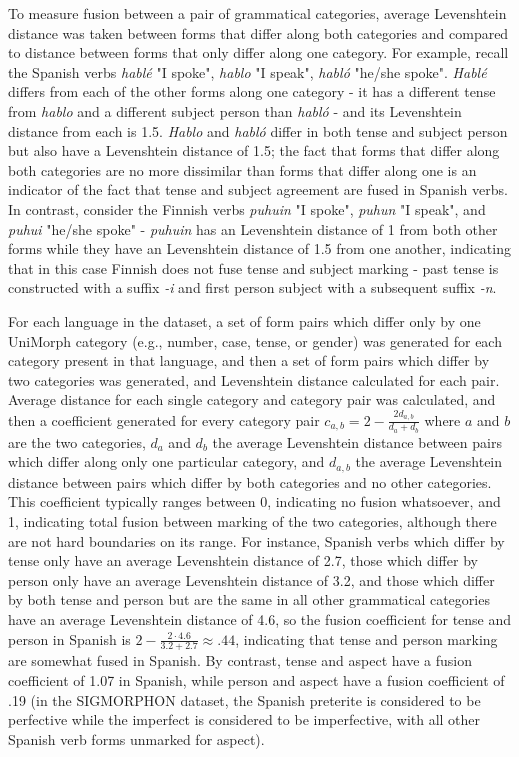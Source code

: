 To measure fusion between a pair of grammatical categories, average Levenshtein distance was taken between forms that differ along both categories and compared to distance between forms that only differ along one category. For example, recall the Spanish verbs \textit{hablé} "I spoke", \textit{hablo} "I speak", \textit{habló} "he/she spoke". \textit{Hablé} differs from each of the other forms along one category - it has a different tense from \textit{hablo} and a different subject person than \textit{habló} - and its Levenshtein distance from each is 1.5. \textit{Hablo} and \textit{habló} differ in both tense and subject person but also have a Levenshtein distance of 1.5; the fact that forms that differ along both categories are no more dissimilar than forms that differ along one is an indicator of the fact that tense and subject agreement are fused in Spanish verbs. In contrast, consider the Finnish verbs \textit{puhuin} "I spoke", \textit{puhun} "I speak", and \textit{puhui} "he/she spoke" - \textit{puhuin} has an Levenshtein distance of 1 from both other forms while they have an Levenshtein distance of 1.5 from one another, indicating that in this case Finnish does not fuse tense and subject marking - past tense is constructed with a suffix \textit{-i} and first person subject with a subsequent suffix \textit{-n}. 

For each language in the dataset, a set of form pairs which differ only by one UniMorph category (e.g., number, case, tense, or gender) was generated for each category present in that language, and then a set of form pairs which differ by two categories was generated, and Levenshtein distance calculated for each pair. Average distance for each single category and category pair was calculated, and then a coefficient generated for every category pair $c_{a,b} = 2 - \frac{2d_{a,b}}{d_a + d_b}$ where $a$ and $b$ are the two categories, $d_a$ and $d_b$ the average Levenshtein distance between pairs which differ along only one particular category, and $d_{a,b}$ the average Levenshtein distance between pairs which differ by both categories and no other categories. This coefficient typically ranges between 0, indicating no fusion whatsoever, and 1, indicating total fusion between marking of the two categories, although there are not hard boundaries on its range. For instance, Spanish verbs which differ by tense only have an average Levenshtein distance of 2.7, those which differ by person only have an average Levenshtein distance of 3.2, and those which differ by both tense and person but are the same in all other grammatical categories have an average Levenshtein distance of 4.6, so the fusion coefficient for tense and person in Spanish is $2 - \frac{2\cdot4.6}{3.2+2.7} \approx .44$, indicating that tense and person marking are somewhat fused in Spanish. By contrast, tense and aspect have a fusion coefficient of 1.07 in Spanish, while person and aspect have a fusion coefficient of .19 (in the SIGMORPHON dataset, the Spanish preterite is considered to be perfective while the imperfect is considered to be imperfective, with all other Spanish verb forms unmarked for aspect).

